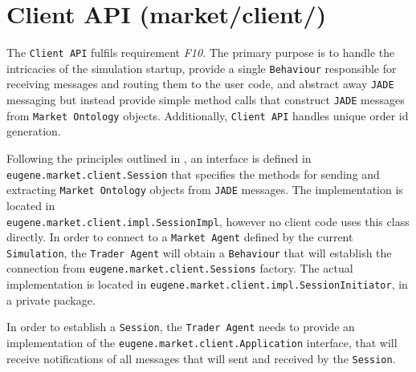 \section{Client API (market/client/)}
\label{Chapters/Background/Client-API}
The \texttt{Client API} fulfils requirement \textit{F10}. The primary purpose is to handle the intricacies of the simulation startup, provide  a single \texttt{Behaviour} responsible for receiving messages and routing them to the user code, and abstract away \texttt{JADE} messaging but instead provide simple method calls that construct \texttt{JADE} messages from \texttt{Market Ontology} objects. Additionally, \texttt{Client API} handles unique order id generation.

Following the principles outlined in , an interface is defined in \\ \texttt{eugene.market.client.Session} that specifies the methods for sending   and extracting \texttt{Market Ontology} objects from \texttt{JADE} messages. The implementation is located in \\\texttt{eugene.market.client.impl.SessionImpl}, however no client code uses this class directly. In order to connect to a \texttt{Market Agent} defined by the current \texttt{Simulation}, the \texttt{Trader Agent} will obtain a \texttt{Behaviour} that will establish the connection from \texttt{eugene.market.client.Sessions} factory. The actual implementation is located in \texttt{eugene.market.client.impl.SessionInitiator}, in a private package. 

In order to establish a \texttt{Session}, the \texttt{Trader Agent} needs to provide an implementation of the \texttt{eugene.market.client.Application} interface, that will receive notifications of all messages that will sent and received by the \texttt{Session}.